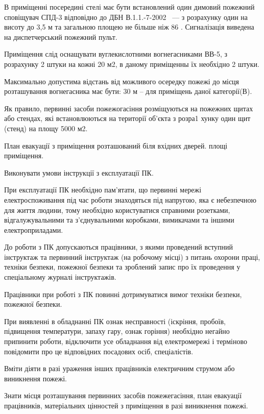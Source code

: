 \documentclass{diploma}
\begin{document}
В приміщенні посередині стелі має бути встановлений один димовий 
пожежний сповіщувач СПД-3 відповідно до ДБН В.1.1.-7-2002~\cite{oh6} –-- з 
розрахунку один на висоту до 3,5 м та загальною площею не більше ніж 86 . 
Сигналізація виведена на диспетчерський пожежний пульт.

Приміщення слід оснащувати вуглекислотними вогнегасниками ВВ-5, 
з розрахунку 2 штуки на кожні 20 м2,
в даному приміщенны їх необхідно 2 штуки.

Максимально допустима відстань від можливого осередку пожежі
до місця розташування вогнегасника має бути: 30 м – для приміщень даної категорії(В).

Як правило, первинні засоби пожежогасіння розміщуються на пожежних
щитах або стендах, які встановлюються на території об’єкта з розра1
хунку один щит (стенд) на площу 5000 м2.

План евакуації з приміщення розташований біля вхідних дверей.
 площі приміщення. 
 
	
\begin{enumerator}
\item Виконувати умови інструкції з експлуатації ПК.
\item При експлуатації ПК  необхідно  пам'ятати,  що  первинні мережі  електроспоживання під час роботи знаходяться під напругою, яка є небезпечною для життя людини,  тому необхідно  користуватися справними    розетками,    відгалужувальними    та  з'єднувальними коробками, вимикачами та іншими електроприладами.
\item До  роботи  з  ПК  допускаються  працівники,   з   якими проведений   вступний   інструктаж  та  первинний  інструктаж  (на робочому місці) з питань охорони праці,  техніки безпеки, пожежної безпеки  та  зроблений  запис  про  їх  проведення  у спеціальному журналі інструктажів.
\item Працівники при роботі з ПК повинні  дотримуватися  вимог техніки безпеки, пожежної безпеки.
\item При   виявленні   в  обладнанні  ПК  ознак  несправності (іскріння,  пробоїв,  підвищення температури,  запаху гару,  ознак горіння)   необхідно  негайно  припинити  роботи,  відключити  усе обладнання  від  електромережі  і  терміново  повідомити  про   це відповідних посадових осіб, спеціалістів.
\item Вміти   діяти   в   разі   ураження   інших  працівників електричним струмом або виникнення пожежі.
\item Знати    місця    розташування     первинних     засобів пожежегасіння,  план евакуації працівників, матеріальних цінностей з приміщення в разі виникнення пожежі.
\end{enumerator}	
	
\end{document}
